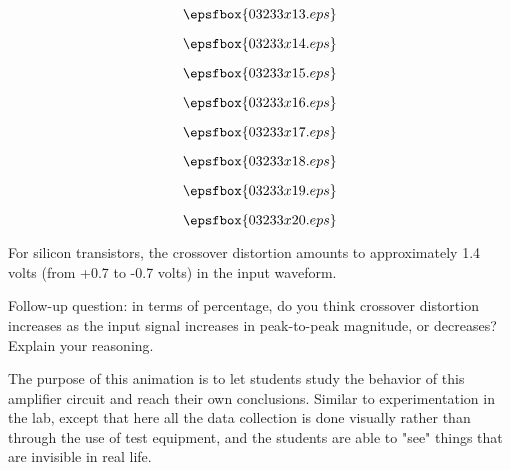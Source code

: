 \vfil \eject
$$\epsfbox{03233x13.eps}$$

\vfil \eject
$$\epsfbox{03233x14.eps}$$

\vfil \eject
$$\epsfbox{03233x15.eps}$$

\vfil \eject
$$\epsfbox{03233x16.eps}$$

\vfil \eject
$$\epsfbox{03233x17.eps}$$

\vfil \eject
$$\epsfbox{03233x18.eps}$$

\vfil \eject
$$\epsfbox{03233x19.eps}$$

\vfil \eject
$$\epsfbox{03233x20.eps}$$


\vfil \eject







For silicon transistors, the crossover distortion amounts to approximately 1.4 volts (from +0.7 to -0.7 volts) in the input waveform.

\vskip 10pt

Follow-up question: in terms of percentage, do you think crossover distortion increases as the input signal increases in peak-to-peak magnitude, or decreases?  Explain your reasoning.







The purpose of this animation is to let students study the behavior of this amplifier circuit and reach their own conclusions.  Similar to experimentation in the lab, except that here all the data collection is done visually rather than through the use of test equipment, and the students are able to "see" things that are invisible in real life.




